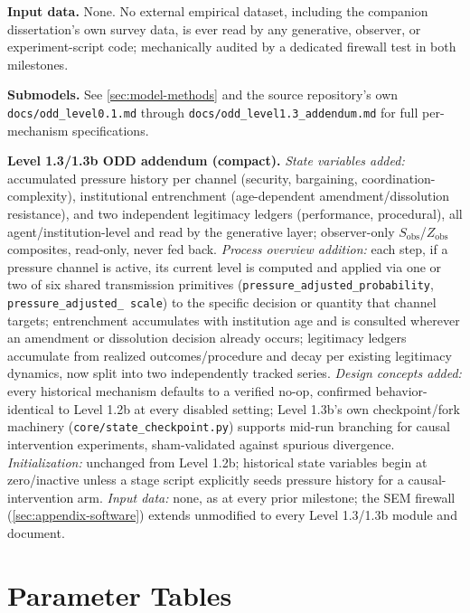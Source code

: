 \textbf{Input data.} None. No external empirical dataset, including the
companion dissertation's own survey data, is ever read by any generative,
observer, or experiment-script code; mechanically audited by a dedicated
firewall test in both milestones.

\textbf{Submodels.} See \cref{sec:model-methods} and the source
repository's own \texttt{docs/odd\_level0.1.md} through
\texttt{docs/odd\_level1.3\_addendum.md} for full per-mechanism
specifications.

\textbf{Level 1.3/1.3b ODD addendum (compact).} \textit{State variables
added:} accumulated pressure history per channel (security, bargaining,
coordination-complexity), institutional entrenchment (age-dependent
amendment/dissolution resistance), and two independent legitimacy ledgers
(performance, procedural), all agent/institution-level and read by the
generative layer; observer-only $S_{\text{obs}}$/$Z_{\text{obs}}$
composites, read-only, never fed back. \textit{Process overview addition:}
each step, if a pressure channel is active, its current level is computed
and applied via one or two of six shared transmission primitives
(\texttt{pressure\_adjusted\_probability}, \texttt{pressure\_adjusted\_%
scale}) to the specific decision or quantity that channel targets;
entrenchment accumulates with institution age and is consulted wherever an
amendment or dissolution decision already occurs; legitimacy ledgers
accumulate from realized outcomes/procedure and decay per existing
legitimacy dynamics, now split into two independently tracked series.
\textit{Design concepts added:} every historical mechanism defaults to a
verified no-op, confirmed behavior-identical to Level 1.2b at every
disabled setting; Level 1.3b's own checkpoint/fork machinery
(\texttt{core/state\_checkpoint.py}) supports mid-run branching for causal
intervention experiments, sham-validated against spurious divergence.
\textit{Initialization:} unchanged from Level 1.2b; historical state
variables begin at zero/inactive unless a stage script explicitly seeds
pressure history for a causal-intervention arm. \textit{Input data:} none,
as at every prior milestone; the SEM firewall (\cref{sec:appendix-software})
extends unmodified to every Level 1.3/1.3b module and document.

\clearpage
\section{Parameter Tables}
\label{sec:appendix-parameters}
\label{sec:appendix-tables}

